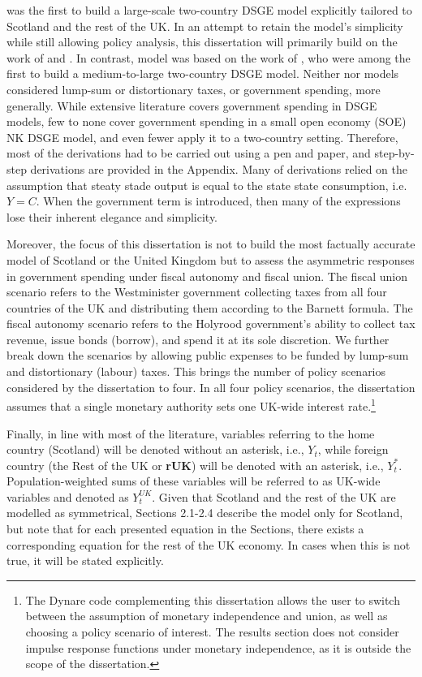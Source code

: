 \textcite{ricci_2019_essays} was the first to build a large-scale two-country DSGE model explicitly tailored to Scotland and the rest of the UK. In an attempt to retain the model's simplicity while still allowing policy analysis, this dissertation will primarily build on the work of \textcite{gali_2005_monetary} and \textcite{jordigal_2015_monetary}. In contrast, \textcite{ricci_2019_essays} model was based on the work of \textcite{rabanal_2010_eurodollar}, who were among the first to build a medium-to-large two-country DSGE model. Neither \textcite{gali_2005_monetary} nor \textcite{jordigal_2015_monetary} models considered lump-sum or distortionary taxes, or government spending, more generally. While extensive literature covers government spending in DSGE models, few to none cover government spending in a small open economy (SOE) NK DSGE model, and even fewer apply it to a two-country setting. Therefore, most of the derivations had to be carried out using a pen and paper, and step-by-step derivations are provided in the Appendix. Many of \textcite{jordigal_2015_monetary} derivations relied on the assumption that steaty stade output is equal to the state state consumption, i.e. $Y=C$. When the government term is introduced, then many of the expressions lose their inherent elegance and simplicity.

Moreover, the focus of this dissertation is not to build the most factually accurate model of Scotland or the United Kingdom but to assess the asymmetric responses in government spending under fiscal autonomy and fiscal union. The fiscal union scenario refers to the Westminister government collecting taxes from all four countries of the UK and distributing them according to the Barnett formula. The fiscal autonomy scenario refers to the Holyrood government's ability to collect tax revenue, issue bonds (borrow), and spend it at its sole discretion. We further break down the scenarios by allowing public expenses to be funded by lump-sum and distortionary (labour) taxes. This brings the number of policy scenarios considered by the dissertation to four. In all four policy scenarios, the dissertation assumes that a single monetary authority sets one UK-wide interest rate.\footnote{The Dynare code complementing this dissertation allows the user to switch between the assumption of monetary independence and union, as well as choosing a policy scenario of interest. The results section does not consider impulse response functions under monetary independence, as it is outside the scope of the dissertation.}

Finally, in line with most of the literature, variables referring to the home country (Scotland) will be denoted without an asterisk, i.e., $Y_t$, while foreign country (the Rest of the UK or \textbf{rUK}) will be denoted with an asterisk, i.e., $Y^*_t$. Population-weighted sums of these variables will be referred to as UK-wide variables and denoted as $Y_t^{UK}$. Given that Scotland and the rest of the UK are modelled as symmetrical, Sections 2.1-2.4 describe the model only for Scotland, but note that for each presented equation in the Sections, there exists a corresponding equation for the rest of the UK economy. In cases when this is not true, it will be stated explicitly.